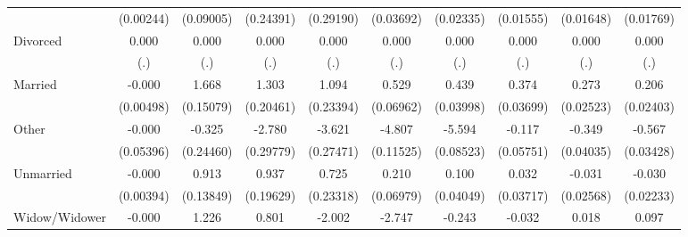 {\begin{tabular}{l*{9}{c}}
                    &   (0.00244)         &   (0.09005)         &   (0.24391)         &   (0.29190)         &   (0.03692)         &   (0.02335)         &   (0.01555)         &   (0.01648)         &   (0.01769)         \\
Divorced            &       0.000         &       0.000         &       0.000         &       0.000         &       0.000         &       0.000         &       0.000         &       0.000         &       0.000         \\
                    &         (.)         &         (.)         &         (.)         &         (.)         &         (.)         &         (.)         &         (.)         &         (.)         &         (.)         \\
Married             &      -0.000         &       1.668\sym{***}&       1.303\sym{***}&       1.094\sym{***}&       0.529\sym{***}&       0.439\sym{***}&       0.374\sym{***}&       0.273\sym{***}&       0.206\sym{***}\\
                    &   (0.00498)         &   (0.15079)         &   (0.20461)         &   (0.23394)         &   (0.06962)         &   (0.03998)         &   (0.03699)         &   (0.02523)         &   (0.02403)         \\
Other               &      -0.000         &      -0.325         &      -2.780\sym{***}&      -3.621\sym{***}&      -4.807\sym{***}&      -5.594\sym{***}&      -0.117\sym{*}  &      -0.349\sym{***}&      -0.567\sym{***}\\
                    &   (0.05396)         &   (0.24460)         &   (0.29779)         &   (0.27471)         &   (0.11525)         &   (0.08523)         &   (0.05751)         &   (0.04035)         &   (0.03428)         \\
Unmarried           &      -0.000         &       0.913\sym{***}&       0.937\sym{***}&       0.725\sym{**} &       0.210\sym{**} &       0.100\sym{*}  &       0.032         &      -0.031         &      -0.030         \\
                    &   (0.00394)         &   (0.13849)         &   (0.19629)         &   (0.23318)         &   (0.06979)         &   (0.04049)         &   (0.03717)         &   (0.02568)         &   (0.02233)         \\
Widow/Widower       &      -0.000         &       1.226\sym{***}&       0.801\sym{***}&      -2.002\sym{***}&      -2.747\sym{***}&      -0.243\sym{***}&      -0.032         &       0.018         &       0.097\sym{***}\\

\end{tabular}}
